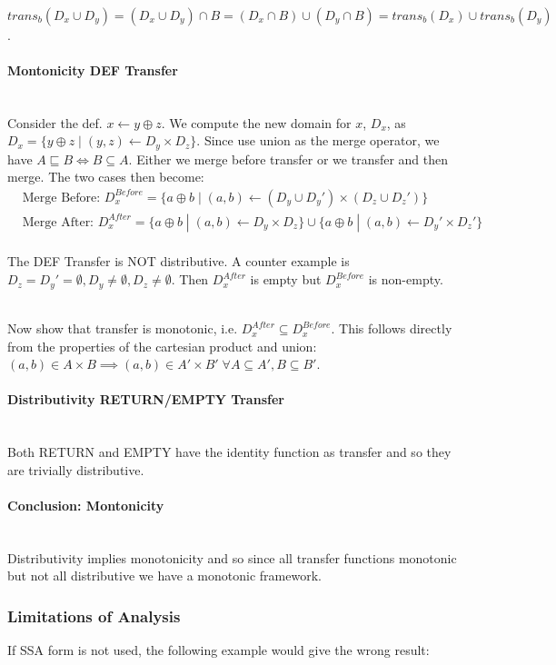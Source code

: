 \documentclass[a4paper]{article}
\newcommand{\NL}[0]{ \hfill\\\noindent }
\begin{document}
\NL
$trans_b(D_x \cup D_y) = (D_x \cup D_y) \cap B = (D_x \cap B) \cup (D_y \cap B) = trans_b(D_x) \cup trans_b(D_y)$.

\paragraph{Montonicity DEF Transfer}\NL
Consider the def. $x \leftarrow y \oplus z$. We compute the new domain for $x$, $D_x$, as $D_x = \{ y \oplus z \;|\; (y,z) \leftarrow D_y \times D_z\}$. Since use union as the merge operator, we have $A \sqsubseteq B \iff B \subseteq A$. Either we merge before transfer or we transfer and then merge. The two cases then become:
\begin{align*}
&\text{Merge Before: } D_x^{Before} = \{a \oplus b \; | \; (a, b) \leftarrow (D_y \cup D_y') \times (D_z \cup D_z') \} \\
&\text{Merge After: } D_x^{After} = \{a \oplus b \; | \; (a, b) \leftarrow D_y \times D_z \} \cup \{a \oplus b \; | \; (a, b) \leftarrow D_y' \times D_z' \}
\end{align*}
\NL
The DEF Transfer is NOT distributive. A counter example is $D_z = D_y' = \emptyset, D_y\neq \emptyset, D_z \neq \emptyset$. Then $D_x^{After}$ is empty but $D_x^{Before}$ is non-empty. 

\NL
Now show that transfer is monotonic, i.e. $D_x^{After} \subseteq D_x^{Before}$. This follows directly from the properties of the cartesian product and union: $(a,b) \in A \times B \implies (a,b) \in A' \times B' \;\forall A \subseteq A', B \subseteq B'$.

\paragraph{Distributivity RETURN/EMPTY Transfer}\NL
Both RETURN and EMPTY have the identity function as transfer and so they are trivially distributive.

\paragraph{Conclusion: Montonicity}\NL
Distributivity implies monotonicity and so since all transfer functions monotonic but not all distributive we have a monotonic framework. 

\subsubsection{Limitations of Analysis}
If SSA form is not used, the following example would give the wrong result:
\end{document}
